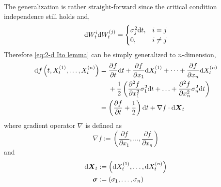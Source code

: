 \documentclass{homework}
\begin{document}
\begin{subproblem}[(\alph*)]
        \item
        The generalization is rather straight-forward since
        the critical condition independence still holds and,
        \[\mathrm d W_t^{i}\mathrm d W_t^{(j)}=
        \begin{cases}
            \sigma_j^2\mathrm d t,&i=j\\
            0,&i\neq j
        \end{cases}\]
        Therefore \cref{eq:2-d Ito lemma} can be simply generalized
        to $n$-dimension,
        \begin{equation*}
            \begin{aligned}
            \mathrm d f\left(t,X_t^{(1)},\ldots,X_t^{(n)}\right)&=
            \begin{aligned}[t]
            &\frac{\partial f}{\partial t}\mathrm d t
            +\frac{\partial f}{\partial x_1}\mathrm d X_t^{(1)}
            +\cdots
            +\frac{\partial f}{\partial x_n}\mathrm d X_t^{(n)}\\
            &+\frac{1}{2}\left(
                \frac{\partial^2 f}{\partial x_1^2}\sigma_1^2\mathrm d t
                +\ldots
                +\frac{\partial^2 f}{\partial x_n^2}\sigma_n^2\mathrm d t
            \right)
            \end{aligned}\\
            &=\left(\frac{\partial f}{\partial t}
            +\frac{1}{2}\right)\mathrm d t
            +\nabla f\cdot\mathrm d\boldsymbol X_t
            \end{aligned}
        \end{equation*}
        where gradient operator $\nabla$ is defined as
        \[\nabla f:=\left(\frac{\partial f}{\partial x_1},\ldots,\frac{\partial f}{\partial x_n}\right)\]
        and
        \[\begin{aligned}
            \mathrm d\boldsymbol X_t&:=
            \left(\mathrm d X_t^{(1)},\ldots,\mathrm d X_t^{(n)}\right)\\
            \boldsymbol\sigma&:=
            \left(\sigma_1,\ldots,\sigma_n\right)
        \end{aligned}\]
        
        \item
    \end{subproblem}
\end{document}
